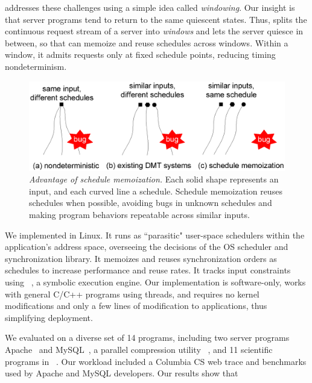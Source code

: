 \tern addresses these challenges using a simple idea called
\emph{windowing}.  Our insight is that server programs tend to return to the
same quiescent states. Thus, \tern splits the continuous request stream of a
server into \emph{windows} and lets the server quiesce in between, so that \tern
can memoize and reuse schedules across windows.  Within a window, it admits
requests only at fixed schedule points, reducing timing nondeterminism.

\begin{figure}[t]
\centering
\includegraphics[width=.5\textwidth]{tern/figures/idea.eps}
\caption{\small{\em Advantage of schedule memoization.}  Each solid shape
  represents an input, and each curved line a schedule.  Schedule
  memoization reuses schedules when possible, avoiding bugs in unknown
  schedules and making program behaviors repeatable across similar
  inputs.}
\label{fig:tern-idea}
\end{figure}%


We implemented \tern in Linux.  It runs as ``parasitic"
user-space schedulers within the application's address space, overseeing
the decisions of the OS scheduler and synchronization library.  It
memoizes and reuses synchronization orders as schedules to increase
performance and reuse rates. It tracks input constraints using
\klee~\cite{klee:osdi08}, a symbolic execution engine.  Our implementation
is software-only, works with general C/C++ programs using threads, and
requires no kernel modifications and only a few lines of modification to
applications, thus simplifying deployment.

We evaluated \tern on a diverse set of 14 programs, including two server
programs Apache~\cite{apache} and MySQL~\cite{mysql}, a parallel
compression utility \pbzip~\cite{pbzip2}, and 11 scientific programs in
\splash~\cite{splash2}.  Our workload included a Columbia CS web trace and
benchmarks used by Apache and MySQL developers.  Our results show that


